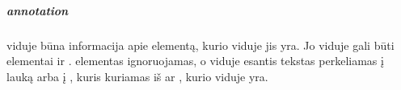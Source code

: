\documentclass[letterpaper,10pt,lithuanian]{sphinxmanual}
\begin{document}
\subparagraph{annotation}
\label{\detokenize{schemos/xsd:annotation}}\label{\detokenize{schemos/xsd:xsd-annotation}}
\sphinxAtStartPar
{} viduje būna informacija apie elementą, kurio viduje jis yra. Jo viduje gali būti
elementai {\hyperref[\detokenize{schemos/xsd:xsd-documentation}]{}} ir {\hyperref[\detokenize{schemos/xsd:xsd-appinfo}]{}}. {\hyperref[\detokenize{schemos/xsd:xsd-appinfo}]{}} elementas ignoruojamas,
o {\hyperref[\detokenize{schemos/xsd:xsd-documentation}]{}} viduje esantis tekstas perkeliamas į lauką {\hyperref[\detokenize{dimensijos:property.description}]{}}
arba į {\hyperref[\detokenize{dimensijos:model.description}]{}}, kuris kuriamas iš  ar , kurio
viduje  yra.
\end{document}
